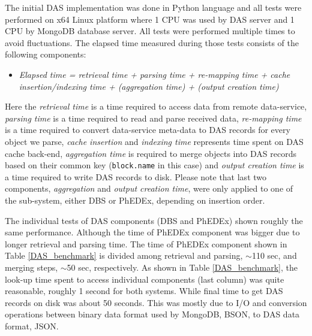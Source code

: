 \documentclass[1p,times]{elsarticle}
\begin{document}
The initial DAS implementation was done in Python language \cite{Python}
and all tests were performed on x64 Linux platform where
1 CPU was used by DAS server and 1 CPU by MongoDB database server. 
All tests were performed multiple times to avoid fluctuations. 
The elapsed time measured during those tests consists of the 
following components:
\begin{itemize}
\item[]
{\it
Elapsed time = retrieval time + parsing time + re-mapping time 
        + cache insertion/indexing time 
        + (aggregation time) + (output creation time)
}
\end{itemize}
Here the {\it retrieval time} is a time required to access data from remote data-service,
{\it parsing time} is a time required to read and parse received data, {\it re-mapping time}
is a time required to convert data-service meta-data to DAS records for every object
we parse, {\it cache insertion} and {\it indexing time} represents time spent on DAS 
cache back-end, {\it aggregation time} is required to merge objects into DAS records based
on their common key (\verb+block.name+ in this case) and {\it output creation time}
is a time required to write DAS records to disk. Please note that last two
components, {\it aggregation} and {\it output creation time}, were only applied to
one of the sub-system, either DBS or PhEDEx, depending on insertion order.

%

The individual tests of DAS components (DBS and PhEDEx) shown roughly 
the same performance. Although the time of PhEDEx component was bigger 
due to longer retrieval and parsing time.
The time of PhEDEx component shown in Table \ref{DAS_benchmark} is divided 
among retrieval and parsing, $\sim$110 sec, and merging steps, $\sim$50 sec,
respectively. As shown in Table \ref{DAS_benchmark},
the look-up time spent to access individual components (last column) was quite
reasonable, roughly 1 second for both systems. While final time to
get DAS records on disk was about 50 seconds. This was mostly due to I/O and
conversion operations between binary data format used by MongoDB, BSON, to DAS
data format, JSON.
\end{document}
